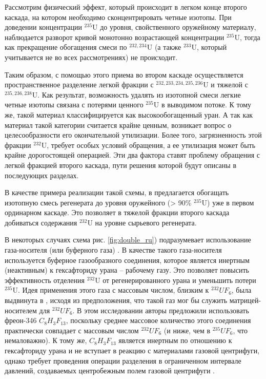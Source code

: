 Рассмотрим физический эффект, который происходит в легком конце второго каскада, на котором необходимо сконцентрировать четные изотопы.
При доведении концентрации $^{235}$U до уровня, свойственного оружейному материалу, наблюдается разворот кривой монотонно возрастающей концентрации $^{235}$U, тогда как прекращение обогащения смеси по $^{232,234}$U (а также $^{233}$U, который учитывается не во всех рассмотрениях) не происходит.

Таким образом, с помощью этого приема во втором каскаде осуществляется пространственное разделение легкой фракции с $^{232,233,234,235,236}$U и тяжелой с $^{235,236,238}$U.
Как результат, возможность удалять из изотопной смеси легкие четные изотопы связана с потерями ценного $^{235}$U в выводимом потоке.
К тому же, такой материал классифицируется как высокообогащенный уран.
А так как материал такой категории считается крайне ценным, возникает вопрос о целесообразности его окончательной утилизации.
Более того, загрязненность этой фракции $^{232}$U, требует особых условий обращения, а ее утилизация может быть крайне дорогостоящей операцией.
Эти два фактора ставят проблему обращения с легкой фракцией второго каскада, пути решения которой будут описаны в последующих разделах.

В качестве примера реализации такой схемы, в \cite{vodolazskihSposobIzotopnogoVosstanovleniya} предлагается обогащать изотопную смесь регенерата до уровня оружейного (> 90\% $^{235}$U) уже в первом ординарном каскаде.
Это позволяет в тяжелой фракции второго каскада добиваться содержания $^{232}$U на уровне сырьевого регенерата.

В некоторых случаях схема рис. \ref{fig:double_ru}) подразумевает использование газа-носителя (или буферного газа) \cite{prusakovCorrectingIsotopicComposition2008, SposobIzotopnogoVosstanovleniyab}.
В качестве такого газа-носителя используется буферное газообразного соединения, которое является инертным (неактивным) к гексафториду урана -- рабочему газу. 
Это позволяет повысить эффективность отделения $^{232}$U от регенерированного урана и уменьшить потери $^{235}$U.
Идея применения этого газа с массовым числом, близким к $^{232}UF_6$, была выдвинута в \cite{SosninYuChelcov}, исходя из предположения, что такой газ мог бы служить матрицей-носителем для $^{232}UF_6$.
В этом исследовании авторы предложили использовать фреон-346 $C_{8}H_{3}F_{13}$, поскольку среднее массовое количество этого соединения практически совпадает с массовым числом $^{232}UF_6$ (и ниже, чем в $^{235}UF_6$, что немаловажно).
К тому же, $C_{8}H_{3}F_{13}$ является инертным по отношению к гексафториду урана и не вступает в реакцию с материалами газовой центрифуги, однако требует проведения операции разделения в ограниченном интервале давлений, создаваемых центробежным полем газовой центрифуги \cite{prusakovCorrectingIsotopicComposition2008}.

